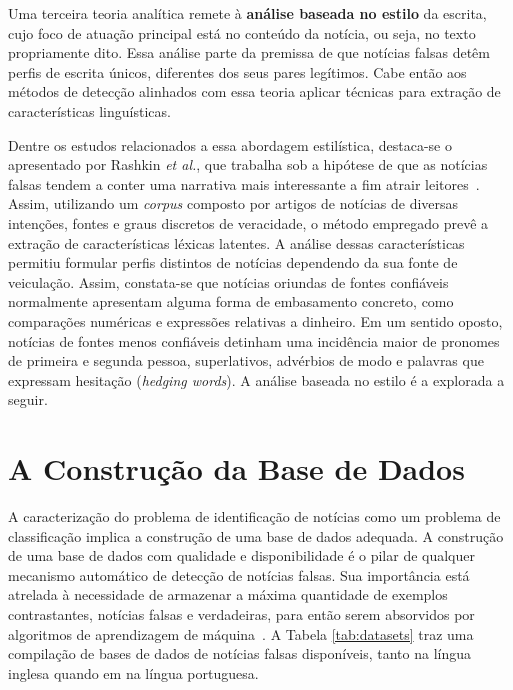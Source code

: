 \documentclass{SBCbookchapter}
\begin{document}
Uma terceira teoria analítica remete à \textbf{análise baseada no estilo} da escrita, cujo foco de atuação principal está no conteúdo da notícia, ou seja, no texto propriamente dito. Essa análise parte da premissa de que notícias falsas detêm perfis de escrita únicos, diferentes dos seus pares legítimos. Cabe então aos métodos de detecção alinhados com essa teoria aplicar técnicas para extração de características linguísticas.

Dentre os estudos relacionados a essa abordagem estilística, destaca-se o apresentado por Rashkin \textit{et al.}, que trabalha sob a hipótese de que as notícias falsas tendem a conter uma narrativa mais interessante a fim atrair leitores~\cite{rashkin2017truth}. Assim, utilizando um \textit{corpus} composto por artigos de notícias de diversas intenções, fontes e graus discretos de veracidade, o método empregado prevê a extração de características léxicas latentes. A análise dessas características permitiu formular perfis distintos de notícias dependendo da sua fonte de veiculação. Assim, constata-se que notícias oriundas de fontes confiáveis normalmente apresentam alguma forma de embasamento concreto, como comparações numéricas e expressões relativas a dinheiro. Em um sentido oposto, notícias de fontes menos confiáveis detinham uma incidência maior de pronomes de primeira e segunda pessoa, superlativos, advérbios de modo e palavras que expressam hesitação (\textit{hedging words}). A análise baseada no estilo é a explorada a seguir.%

\section{A Construção da Base de Dados}
\label{sec:base}

A caracterização do problema de identificação de notícias como um problema de classificação implica a construção de uma base de dados adequada. A construção de uma base de dados com qualidade e disponibilidade é o pilar de qualquer mecanismo automático de detecção de notícias falsas. Sua importância está atrelada à necessidade de armazenar a máxima quantidade de exemplos contrastantes, notícias falsas e verdadeiras, para então serem absorvidos por algoritmos de aprendizagem de máquina~\cite{oshikawa2018survey}. A Tabela \ref{tab:datasets} traz uma compilação de bases de dados de notícias falsas disponíveis, tanto na língua inglesa quando em na língua portuguesa.
\end{document}
